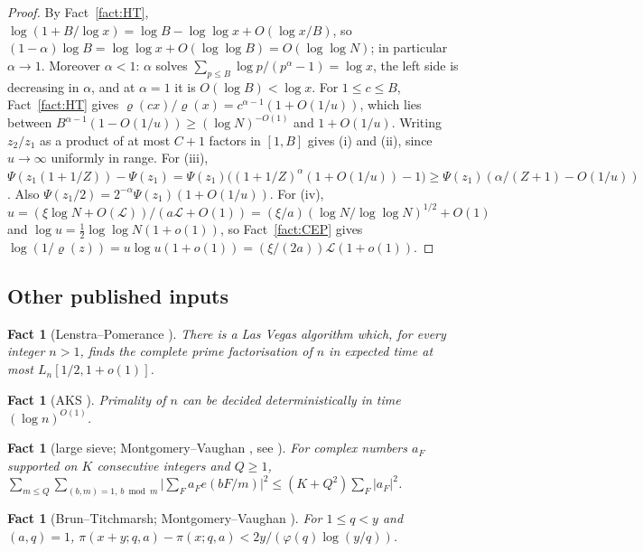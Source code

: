 \documentclass[11pt]{amsart}
\newtheorem{fact}[theorem]{Fact}
\theoremstyle{definition}
\newcommand{\cL}{\mathcal{L}}
\begin{document}
\begin{proof}
By Fact~\ref{fact:HT}, $\log(1+B/\log x)=\log B-\log\log x+O(\log x/B)$, so
$(1-\alpha)\log B=\log\log x+O(\log\log B)=O(\log\log N)$; in particular $\alpha\to1$. Moreover $\alpha<1$: $\alpha$ solves
$\sum_{p\le B}\log p/(p^\alpha-1)=\log x$, the left side is decreasing in $\alpha$, and at $\alpha=1$ it is $O(\log B)<\log x$. For $1\le c\le B$,
Fact~\ref{fact:HT} gives $\varrho(cx)/\varrho(x)=c^{\alpha-1}(1+O(1/u))$, which lies between
$B^{\alpha-1}(1-O(1/u))\ge(\log N)^{-O(1)}$ and $1+O(1/u)$. Writing $z_2/z_1$ as a product of at most $C+1$ factors in
$[1,B]$ gives (i) and (ii), since $u\to\infty$ uniformly in range. For (iii), $\Psi(z_1(1+1/Z))-\Psi(z_1)=\Psi(z_1)\bigl((1+1/Z)^\alpha(1+O(1/u))-1\bigr)\ge\Psi(z_1)(\alpha/(Z+1)-O(1/u))$.
Also $\Psi(z_1/2)=2^{-\alpha}\Psi(z_1)(1+O(1/u))$. For (iv), $u=(\xi\log N+O(\cL))/(a\cL+O(1))=(\xi/a)(\log
N/\log\log N)^{1/2}+O(1)$ and $\log u=\frac12\log\log N(1+o(1))$, so Fact~\ref{fact:CEP} gives
$\log(1/\varrho(z))=u\log u(1+o(1))=(\xi/(2a))\cL(1+o(1))$.
\end{proof}

\subsection{Other published inputs}

\begin{fact}[Lenstra--Pomerance \cite{lp1992}]\label{fact:LP}
There is a Las Vegas algorithm which, for every integer $n>1$, finds the complete prime factorisation of
$n$ in expected time at most $L_n[1/2,1+o(1)]$.
\end{fact}

\begin{fact}[AKS \cite{aks2004}]\label{fact:AKS}
Primality of $n$ can be decided deterministically in time $(\log n)^{O(1)}$.
\end{fact}

\begin{fact}[large sieve; Montgomery--Vaughan {\cite[Thm.~1]{mv1973}}, see \cite{montgomery1978}]\label{fact:LS}
For complex numbers $a_F$ supported on $K$ consecutive integers and $Q\ge1$,
$\sum_{m\le Q}\sum_{(b,m)=1,\,b\bmod m}\bigl|\sum_Fa_Fe(bF/m)\bigr|^2\le(K+Q^2)\sum_F|a_F|^2$.
\end{fact}

\begin{fact}[Brun--Titchmarsh; Montgomery--Vaughan {\cite[Thm.~2]{mv1973}}]\label{fact:BT}
For $1\le q<y$ and $(a,q)=1$, $\pi(x+y;q,a)-\pi(x;q,a)<2y/(\varphi(q)\log(y/q))$.
\end{fact}
\end{document}
